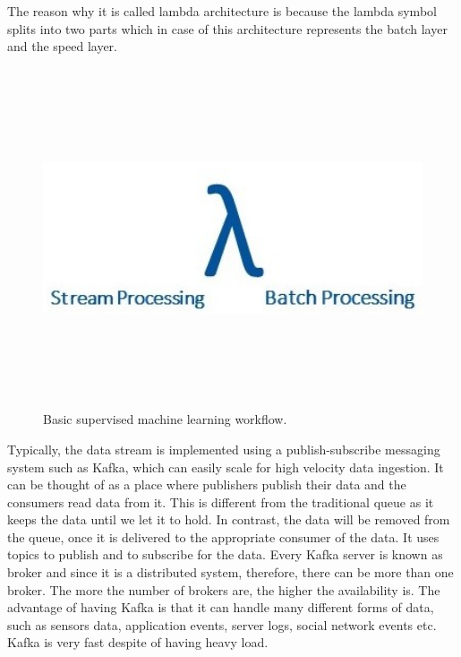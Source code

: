 The reason why it is called lambda architecture is because the lambda symbol splits into two parts which in case of this architecture represents the batch layer and the speed layer. 

\begin{figure}[htpb]
	\centering
	\includegraphics[width=12cm,height=10cm,keepaspectratio=true]{images/lambda_new}
	\caption{
		Basic supervised machine learning workflow.
	}
	\label{fig:lambda}
\end{figure}

Typically, the data stream is implemented using a publish-subscribe messaging system such as Kafka, which can easily scale for high velocity data ingestion. It can be thought of as a place where publishers publish their data and the consumers read data from it. This is different from the traditional queue as it keeps the data until we let it to hold. In contrast, the data will be removed from the queue, once it is delivered to the appropriate consumer of the data. It uses topics to publish and to subscribe for the data. Every Kafka server is known as broker and since it is a distributed system, therefore, there can be more than one broker. The more the number of brokers are, the higher the availability is. The advantage of having Kafka is that it can handle many different forms of data, such as sensors data, application events, server logs, social network events etc. Kafka is very fast despite of having heavy load.

